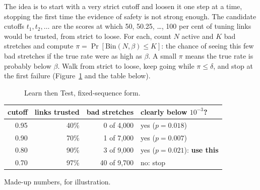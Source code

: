 \documentclass[11pt]{article}
\newcommand{\Bin}{\mathrm{Bin}}
\begin{document}
The idea is to start with a very strict cutoff and loosen it one step at a
time, stopping the first time the evidence of safety is not strong enough.
The candidate cutoffs $t_1,t_2,\dots$ are the scores at which 50, 50.25,
\dots, 100 per cent of tuning links would be trusted, from strict to loose.
For each, count $N$ active and $K$ bad stretches and compute
$\pi=\Pr[\Bin(N,\beta)\le K]$: the chance of seeing this few bad stretches if
the true rate were as high as $\beta$. A small $\pi$ means the true rate is
probably below $\beta$. Walk from strict to loose, keep going while
$\pi\le\delta$, and stop at the first failure (Figure~\ref{fig:ltt} and the
table below).

\begin{figure}[h]
\centering
{}
\caption{Learn then Test, fixed-sequence form.}
\label{fig:ltt}
\end{figure}

\begin{center}
\small
\begin{tabular}{@{}rrrl@{}}
\toprule
cutoff & links trusted & bad stretches & clearly below $10^{-3}$?\\
\midrule
0.95 & 40\% & 0 of 4{,}000 & yes ($p=0.018$)\\
0.90 & 70\% & 1 of 7{,}000 & yes ($p=0.007$)\\
0.80 & 90\% & 3 of 9{,}000 & yes ($p=0.021$): \textbf{use this}\\
0.70 & 97\% & 40 of 9{,}700 & no: stop\\
\bottomrule
\end{tabular}

{\footnotesize Made-up numbers, for illustration.}
\end{center}
\end{document}
